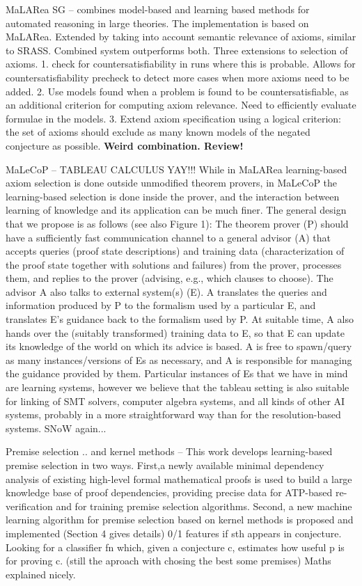 \documentclass{article}
\begin{document}
MaLARea SG \cite{MaLAReaSG} -- combines model-based and learning based methods
for automated reasoning in large theories. The implementation is based on
MaLARea. Extended by taking into account semantic relevance of axioms, similar
to SRASS. Combined system outperforms both. Three extensions to selection of
axioms. 1. check for countersatisfiability in runs where this is probable.
Allows for countersatisfiability precheck to detect more cases when more axioms
need to be added. 2. Use models found when a problem is found to be
countersatisfiable, as an additional criterion for computing axiom relevance.
Need to efficiently evaluate formulae in the models. 3. Extend axiom
specification using a logical criterion: the set of axioms should exclude as
many known models of the negated conjecture as possible. \textbf{Weird
combination. Review!}

MaLeCoP \cite{malecop} -- TABLEAU CALCULUS YAY!!! While in MaLARea
learning-based axiom selection is done outside unmodified theorem provers, in
MaLeCoP the learning-based selection is done inside the prover, and the
interaction between learning of knowledge and its application can be much
finer. The general design that we propose is as follows (see also Figure 1):
The theorem prover (P) should have a sufficiently fast communication channel to
a general advisor (A) that accepts queries (proof state descriptions) and
training data (characterization of the proof state together with solutions
and failures) from the prover, processes them, and replies to the prover
(advising, e.g., which clauses to choose). The advisor A also talks to external
system(s) (E). A translates the queries and information produced by P to the
formalism used by a particular E, and translates E’s guidance back to the
formalism used by P. At suitable time, A also hands over the (suitably
transformed) training data to E, so that E can update its knowledge of the
world on which its advice is based. A is free to spawn/query as many
instances/versions of Es as necessary, and A is responsible for managing the
guidance provided by them. Particular instances of Es that we have in mind are
learning systems, however we believe that the tableau setting is also suitable
for linking of SMT solvers, computer algebra systems, and all kinds of other AI
systems, probably in a more straightforward way than for the resolution-based
systems. SNoW again...

Premise selection .. and kernel methods \cite{PremiseSelection} -- This  work
develops  learning-based  premise  selection  in  two  ways.  First,a  newly
available  minimal dependency  analysis  of  existing  high-level  formal
mathematical proofs is used to build a large knowledge base of proof
dependencies,  providing  precise  data  for  ATP-based  re-verification  and
for  training premise selection algorithms.  Second, a new machine learning
algorithm for premise selection based on kernel methods is proposed and
implemented (Section 4 gives details) 0/1 features if sth appears in
conjecture. Looking for a classifier fn which, given a conjecture c, estimates
how useful p is for proving c. (still the aproach with chosing the best some
premises) Maths explained nicely.
\end{document}
